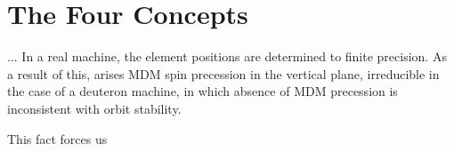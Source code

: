 \documentclass{article}
\begin{document}
\section*{The Four Concepts}
...
In a real machine, the element positions are determined to finite precision. As a result of this, arises MDM spin precession in the vertical plane, irreducible in the case of a deuteron machine, in which absence of MDM precession is inconsistent with orbit stability.

This fact forces us 
\end{document}
